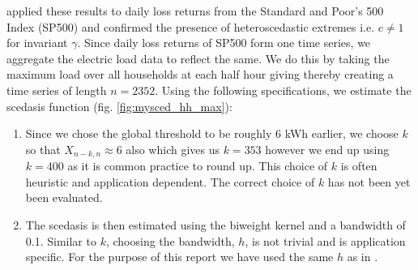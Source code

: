 
 \citet{einmahl16} applied these results to daily loss returns from the Standard and Poor's 500 Index (SP500) and confirmed the presence of heteroscedastic extremes i.e. $c \neq 1$ for invariant $\gamma$. Since daily loss returns of SP500 form one time series, we aggregate the electric load data to reflect the same. We do this by taking the maximum load over all households at each half hour giving thereby creating a time series of length $n=2352$. Using the following specifications, we estimate the scedasis function (fig. \ref{fig:mysced_hh_max}):%
\begin{enumerate}
\item Since we chose the global threshold to be roughly 6 kWh earlier, we choose $k$ so that $X_{n-k,n} \approx 6$ also which gives us $k=353$ however we end up using $k=400$ as it is common practice to round up. This choice of $k$ is often heuristic and application dependent. The correct choice of $k$ has not been yet been evaluated. 
\item The scedasis is then estimated using the biweight kernel and a bandwidth of 0.1. Similar to $k$, choosing the bandwidth, $h$, is not trivial and is application specific. For the purpose of this report we have used the same $h$ as in \citet{einmahl16}.
\end{enumerate}


